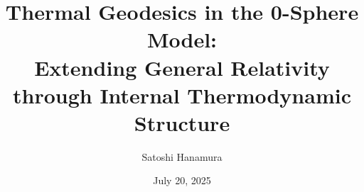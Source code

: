 \documentclass[%
 reprint,
 amsmath,amssymb,
 aps,
]{revtex4-1}
\numberwithin{equation}{section}%
\begin{document}


\title{Thermal Geodesics in the 0-Sphere Model:\\ Extending General Relativity through Internal Thermodynamic Structure}
\author{Satoshi Hanamura}
\date{July 20, 2025}




\end{document}
